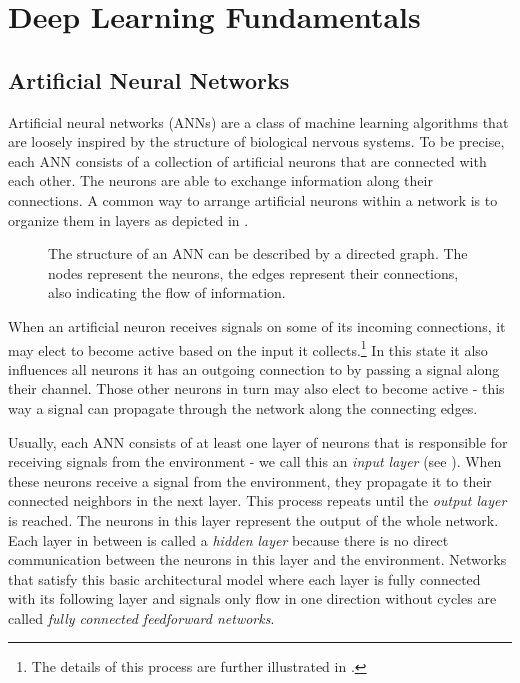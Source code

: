 \chapter{Deep Learning Fundamentals}

\section{Artificial Neural Networks}

Artificial neural networks (ANNs) are a class of machine learning algorithms
that are loosely inspired by the structure of biological nervous
systems.
To be precise, each ANN consists of a collection of artificial neurons
that are connected with each other. The neurons are able to exchange
information along their connections.
A common way to arrange artificial neurons within a network is to organize
them in layers as depicted in .
\begin{figure}[h]
  \centering
  \resizebox{0.75\textwidth}{!}{}
  \caption{The structure of an ANN can be described by a
    directed graph. The nodes represent the
    neurons, the edges represent their connections, also indicating
    the flow of information.}
  \label{fig:basic-network}
\end{figure}

When an artificial neuron receives signals on some of its
incoming connections, it may elect to become active based on the input
it collects.\footnote{The
  details of this
  process are further illustrated in .}
In this state it also influences all neurons it has an outgoing
connection to by passing a signal along their
channel. Those other neurons in turn may also elect to become
active - this way a signal can propagate through the network along
the connecting edges.

Usually, each ANN consists of at least one layer of neurons that is
responsible for receiving signals from the environment - we call this
an \textit{input layer} (see ). When these neurons
receive a signal from the environment, they propagate it to their
connected neighbors in the next layer. This process repeats until the
\textit{output layer} is reached. The neurons in this layer represent the
output of the whole network. Each layer in between is called a \textit{hidden
layer} because there is no direct communication between the neurons in
this layer and the environment. Networks that satisfy this basic
architectural model where each layer is fully connected with its
following layer and signals only flow in one direction without cycles
are called
\textit{fully connected feedforward networks}.

